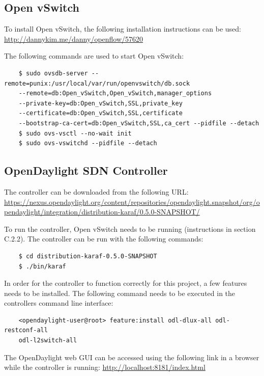 \begin{appendices}
\subsection{Open vSwitch}
To install Open vSwitch, the following installation instructions can be used:
\newline
\url{http://dannykim.me/danny/openflow/57620}
\newline
\par
The following commands are used to start Open vSwitch:
\begin{verbatim}
	$ sudo ovsdb-server --remote=punix:/usr/local/var/run/openvswitch/db.sock 
	--remote=db:Open_vSwitch,Open_vSwitch,manager_options 
	--private-key=db:Open_vSwitch,SSL,private_key 
	--certificate=db:Open_vSwitch,SSL,certificate 
	--bootstrap-ca-cert=db:Open_vSwitch,SSL,ca_cert --pidfile --detach
	$ sudo ovs-vsctl --no-wait init
	$ sudo ovs-vswitchd --pidfile --detach
\end{verbatim}

\subsection{OpenDaylight SDN Controller}
The controller can be downloaded from the following URL:
\newline
\url{https://nexus.opendaylight.org/content/repositories/opendaylight.snapshot/org/opendaylight/integration/distribution-karaf/0.5.0-SNAPSHOT/}
\newline
\par
To run the controller, Open vSwitch needs to be running (instructions in section C.2.2). The controller can be run with the following commands:
\begin{verbatim}
	$ cd distribution-karaf-0.5.0-SNAPSHOT
	$ ./bin/karaf
\end{verbatim}
In order for the controller to function correctly for this project, a few features needs to be installed. The following command needs to be executed in the controllers command line interface:
\begin{verbatim}
	<opendaylight-user@root> feature:install odl-dlux-all odl-restconf-all 
	odl-l2switch-all
\end{verbatim}
The OpenDaylight web GUI can be accessed using the following link in a browser while the controller is running:
\url{http://localhost:8181/index.html}


\end{appendices}
